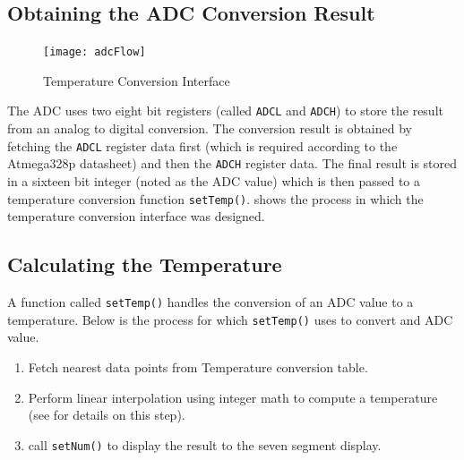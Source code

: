 \documentclass[main.tex]{subfiles}
\begin{document}
		\subsection{Obtaining the ADC Conversion Result}
		\begin{figure}[H]
			\begin{center}
				\texttt{[image: adcFlow]}
			\end{center}
			\caption{Temperature Conversion Interface}
			\label{fig:tempConvIfc}
		\end{figure}

		The ADC uses two eight bit registers (called \lstinline{ADCL} and
		\lstinline{ADCH}) to store the result from an analog to digital conversion.
		The conversion result is obtained by fetching the \lstinline{ADCL} register
		data first (which is required according to the Atmega328p datasheet) and
		then the \lstinline{ADCH} register data. The final result is stored in a
		sixteen bit integer (noted as the ADC value) which is then passed to a
		temperature conversion function \lstinline{setTemp()}. 
		shows the process in which the temperature conversion interface was
		designed.

		\subsection{Calculating the Temperature}
		A function called \lstinline{setTemp()} handles the conversion of an ADC
		value to a temperature. Below is the process for which
		\lstinline{setTemp()} uses to convert and ADC value. 
	
		\begin{enumerate}
			\item Fetch nearest data points from Temperature conversion table.
			\item Perform linear interpolation using integer math to compute a
				temperature (see  for details on this step).
			\item call \lstinline{setNum()} to display the result to the seven segment
				display.
		\end{enumerate}	
\end{document}
